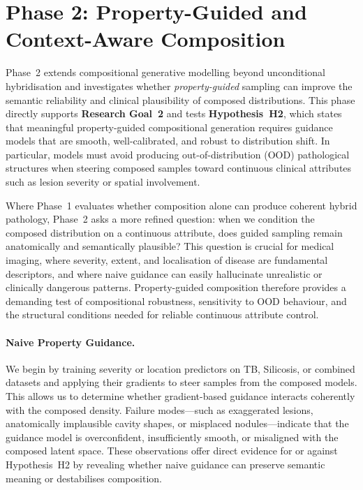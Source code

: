 \section{Phase 2: Property-Guided and Context-Aware Composition}

Phase~2 extends compositional generative modelling beyond unconditional
hybridisation and investigates whether \textit{property-guided} sampling can
improve the semantic reliability and clinical plausibility of composed
distributions. This phase directly supports \textbf{Research Goal~2} and tests
\textbf{Hypothesis~H2}, which states that meaningful property-guided
compositional generation requires guidance models that are smooth,
well-calibrated, and robust to distribution shift. In particular, models must
avoid producing out-of-distribution (OOD) pathological structures when steering
composed samples toward continuous clinical attributes such as lesion severity
or spatial involvement.

Where Phase~1 evaluates whether composition alone can produce coherent hybrid
pathology, Phase~2 asks a more refined question: when we condition the composed
distribution on a continuous attribute, does guided sampling remain anatomically
and semantically plausible? This question is crucial for medical imaging, where
severity, extent, and localisation of disease are fundamental descriptors, and
where naive guidance can easily hallucinate unrealistic or clinically dangerous
patterns. Property-guided composition therefore provides a demanding test of
compositional robustness, sensitivity to OOD behaviour, and the structural
conditions needed for reliable continuous attribute control.

\paragraph{Naive Property Guidance.}
We begin by training severity or location predictors on TB, Silicosis, or
combined datasets and applying their gradients to steer samples from the
composed models. This allows us to determine whether gradient-based guidance
interacts coherently with the composed density. Failure modes—such as
exaggerated lesions, anatomically implausible cavity shapes, or misplaced
nodules—indicate that the guidance model is overconfident, insufficiently
smooth, or misaligned with the composed latent space. These observations offer
direct evidence for or against Hypothesis~H2 by revealing whether naive guidance
can preserve semantic meaning or destabilises composition.

